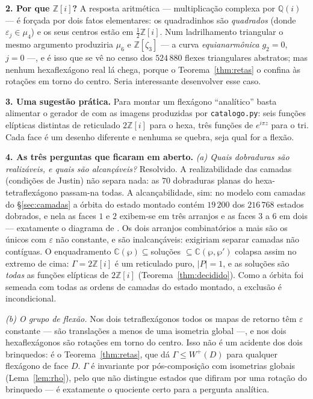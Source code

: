 \documentclass[11pt,a4paper]{article}
\theoremstyle{plain}
\theoremstyle{definition}
\theoremstyle{remark}
\newcommand{\C}{\mathbb{C}}
\newcommand{\Z}{\mathbb{Z}}
\newcommand{\Q}{\mathbb{Q}}
\newcommand{\Zi}{\Z[i]}
\begin{document}
\smallskip
\textbf{2. Por que $\Zi$?} A resposta aritmética --- multiplicação complexa por
$\Q(i)$ --- é forçada por dois fatos elementares: os quadradinhos são
\emph{quadrados} (donde $\varepsilon_j\in\mu_4$) e os seus centros estão em
$\frac12\Zi$. Num ladrilhamento triangular o mesmo argumento produziria
$\mu_6$ e $\Z[\zeta_3]$ --- a curva \emph{equianarmônica} $g_2=0$, $j=0$ ---, e
é isso que se vê no censo dos $524\,880$ flexes triangulares abstratos; mas
nenhum hexaflexágono real lá chega, porque o Teorema~\ref{thm:retas} o confina
às rotações em torno do centro.
Seria interessante desenvolver esse caso.

\smallskip
\textbf{3. Uma sugestão prática.} Para montar um flexágono ``analítico'' basta
alimentar o gerador de \cite{manual} com as imagens produzidas por
\texttt{catalogo.py}: seis funções elípticas distintas de reticulado $2\Zi$ para
o hexa, três funções de $e^{i\pi z}$ para o tri. Cada face é um desenho
diferente e nenhuma se quebra, seja qual for a flexão.

\smallskip
\textbf{4. As três perguntas que ficaram em aberto.}
\emph{(a) Quais dobraduras são realizáveis, e quais são alcançáveis?}
Resolvido. A realizabilidade das camadas (condições de Justin) não separa nada:
as $70$ dobraduras planas do hexa-tetraflexágono passam-na todas. A
alcançabilidade, sim: no modelo com camadas do §\ref{sec:camadas} a órbita do
estado montado contém $19\,200$ dos $216\,768$ estados dobrados, e nela as
faces $1$ e $2$ exibem-se em três arranjos e as faces $3$ a $6$ em dois ---
exatamente o diagrama de \cite{enimar}. Os dois arranjos combinatórios a mais
são os únicos com $\varepsilon$ não constante, e são inalcançáveis: exigiriam
separar camadas não contíguas. O enquadramento $\C(\wp)\subseteq{}$soluções
$\subseteq\C(\wp,\wp')$ colapsa assim no extremo de cima:
$\Gamma=2\Zi$ é um reticulado puro, $|P|=1$, e as soluções são
\emph{todas} as funções elípticas de $2\Zi$ (Teorema~\ref{thm:decidido}).
Como a órbita foi semeada com todas as ordens de camadas do estado montado, a
exclusão é incondicional.

\smallskip
\emph{(b) O grupo de flexão.} Nos dois tetraflexágonos todos os mapas de
retorno têm $\varepsilon$ constante --- são translações a menos de uma
isometria global ---, e nos dois hexaflexágonos são rotações em torno do
centro. Isso não é um acidente dos dois brinquedos: é o
Teorema~\ref{thm:retas}, que dá $\Gamma\le W^+(D)$ para qualquer flexágono de
face $D$. $\Gamma$ é invariante por pós-composição com isometrias globais
(Lema~\ref{lem:rho}), pelo que não distingue estados que difiram por uma
rotação do brinquedo --- é exatamente o quociente certo para a pergunta
analítica.
\end{document}
